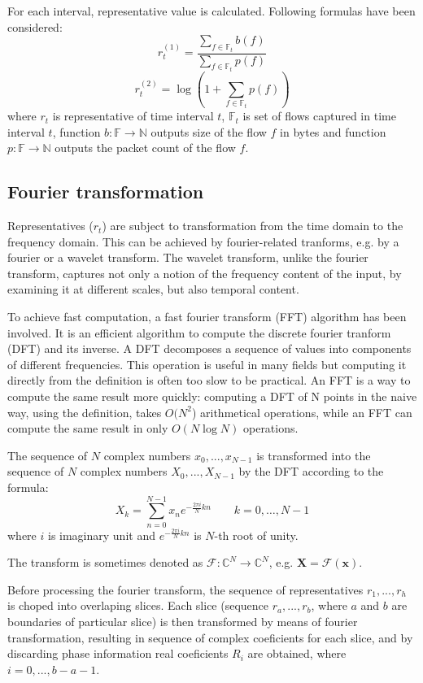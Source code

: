 \documentclass[a4paper]{IEEEtran}
\begin{document}
For each interval,
representative value is calculated. Following formulas have been considered:
\[
r_t^{(1)} = \frac{\sum\limits_{f\in \mathbb{F}_t}b(f)}{\sum\limits_{f\in \mathbb{F}_t}p(f)}
\]
\[
r_t^{(2)} = \log(1+\sum\limits_{f\in \mathbb{F}_t}p(f))
\]
where $r_t$ is representative of time interval $t$, $\mathbb{F}_t$ is set of flows captured in time 
interval $t$, function $b:\mathbb{F} \rightarrow \mathbb{N}$ outputs size of the flow $f$ in bytes and function 
$p:\mathbb{F} \rightarrow \mathbb{N}$ outputs the packet count of the flow $f$.


\subsection{Fourier transformation}
Representatives ($r_t$) are subject to transformation from the time domain to the
frequency domain.
This can be achieved by fourier-related
tranforms, e.g. by a fourier or a wavelet transform.
The wavelet transform, unlike the fourier transform, captures
not only a notion of the frequency content of the input, by
examining it at different scales, but also temporal content.

To achieve fast computation, a fast fourier transform (FFT) algorithm 
has been involved.
It is an efficient algorithm to compute the discrete fourier tranform (DFT) and
its inverse.
A DFT decomposes a sequence of values into components of
different frequencies. 
This operation is useful in many fields but computing it directly from the
definition is often too slow to be practical.
An FFT is a way to compute the same result more quickly: 
computing a DFT of N points in the naive way, using the definition, takes
$O(N^2$) arithmetical operations, 
while an FFT can compute the same result in only $ O(N \log N)$ operations.

The sequence of $N$ complex numbers $x_0, ..., x_{N−1}$ is transformed into the
sequence of $N$ complex numbers $X_0, ..., X_{N−1}$ by the DFT according to the
formula:
\[
X_k = \sum_{n=0}^{N-1} x_n e^{-\frac{2 \pi i}{N} k n} \quad \quad k = 0, \dots, N-1
\]
where $i$ is imaginary unit and $e^{-\frac{2 \pi i}{N} k n}$ is $N$-th root of
unity. 

The transform is sometimes denoted as 
$\mathcal{F}\colon\mathbb{C}^N \to \mathbb{C}^N$, e.g.
$\mathbf{X} = \mathcal{F} \left ( \mathbf{x} \right )$.

Before processing the fourier transform, the sequence of representatives 
$r_1, ...,r_h$ is choped into overlaping slices.
Each slice (sequence $r_a, ..., r_b$, where $a$ and $b$ are boundaries
of particular slice) is then transformed by means of fourier transformation,
resulting in sequence of complex coeficients for each slice,
and by discarding phase information real coeficients ${R}_i$ are obtained,
where $i = 0, ..., b-a-1$.
\end{document}
